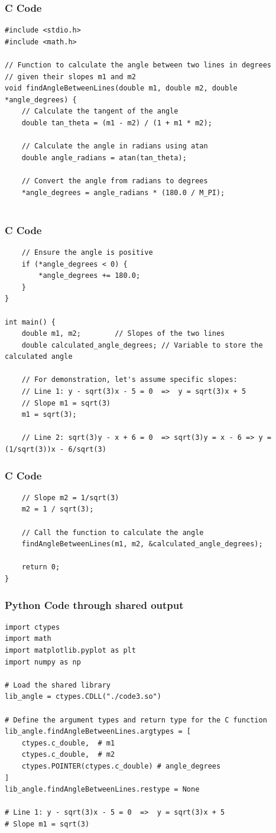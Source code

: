 \documentclass{beamer}
\begin{document}
\begin{frame}[fragile]
\frametitle{C Code}
\begin{lstlisting}
#include <stdio.h>
#include <math.h>

// Function to calculate the angle between two lines in degrees
// given their slopes m1 and m2
void findAngleBetweenLines(double m1, double m2, double *angle_degrees) {
    // Calculate the tangent of the angle
    double tan_theta = (m1 - m2) / (1 + m1 * m2);

    // Calculate the angle in radians using atan
    double angle_radians = atan(tan_theta);

    // Convert the angle from radians to degrees
    *angle_degrees = angle_radians * (180.0 / M_PI);
    
\end{lstlisting}
\end{frame}
\begin{frame}[fragile]
\frametitle{C Code }
\begin{lstlisting}
    // Ensure the angle is positive
    if (*angle_degrees < 0) {
        *angle_degrees += 180.0;
    }
}

int main() {
    double m1, m2;        // Slopes of the two lines
    double calculated_angle_degrees; // Variable to store the calculated angle

    // For demonstration, let's assume specific slopes:
    // Line 1: y - sqrt(3)x - 5 = 0  =>  y = sqrt(3)x + 5
    // Slope m1 = sqrt(3)
    m1 = sqrt(3);

    // Line 2: sqrt(3)y - x + 6 = 0  => sqrt(3)y = x - 6 => y = (1/sqrt(3))x - 6/sqrt(3)
    \end{lstlisting}
\end{frame}
\begin{frame}[fragile]
\frametitle{C Code }
\begin{lstlisting}
    // Slope m2 = 1/sqrt(3)
    m2 = 1 / sqrt(3);

    // Call the function to calculate the angle
    findAngleBetweenLines(m1, m2, &calculated_angle_degrees);
    
    return 0;
}
\end{lstlisting}
\end{frame}

\begin{frame}[fragile]
\frametitle{Python Code through shared output }

\begin{lstlisting}
import ctypes
import math
import matplotlib.pyplot as plt
import numpy as np

# Load the shared library
lib_angle = ctypes.CDLL("./code3.so") 

# Define the argument types and return type for the C function
lib_angle.findAngleBetweenLines.argtypes = [
    ctypes.c_double,  # m1
    ctypes.c_double,  # m2
    ctypes.POINTER(ctypes.c_double) # angle_degrees
]
lib_angle.findAngleBetweenLines.restype = None

# Line 1: y - sqrt(3)x - 5 = 0  =>  y = sqrt(3)x + 5
# Slope m1 = sqrt(3)
\end{lstlisting}
\end{frame}
\end{document}
